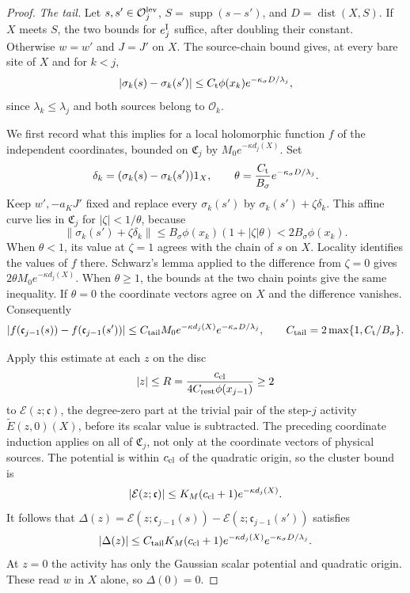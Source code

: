 \documentclass[11pt,letterpaper,reqno]{amsart}
\theoremstyle{definition}
\theoremstyle{remark}
\begin{document}
\begin{proof}
\emph{The tail.}
Let $s,s'\in\mathcal O_j^{\rm lev}$,
$S=\operatorname{supp}(s-s')$, and
$D=\operatorname{dist}(X,S)$. If $X$ meets $S$,
the two bounds for $e_j^{\rm I}$ suffice, after
doubling their constant. Otherwise $w=w'$ and
$J=J'$ on $X$. The source-chain bound gives,
at every bare site of $X$ and for $k<j$,
\[
 |\sigma_k(s)-\sigma_k(s')|
 \le C_{\rm t}\phi(x_k)e^{-\kappa_\sigma D/\lambda_j},
\]
since $\lambda_k\le\lambda_j$ and both sources
belong to $\mathscr O_k$.

We first record what this implies for a local
holomorphic function $f$ of the independent
coordinates, bounded on $\mathfrak C_j$ by
$M_0e^{-\kappa d_j(X)}$. Set
\[
 \delta_k=(\sigma_k(s)-\sigma_k(s'))1_X,
 \qquad
 \theta=\frac{C_{\rm t}}{B_\sigma}
                   e^{-\kappa_\sigma D/\lambda_j}.
\]
Keep $w',-a_KJ'$ fixed and replace every
$\sigma_k(s')$ by $\sigma_k(s')+\zeta\delta_k$.
This affine curve lies in $\mathfrak C_j$ for
$|\zeta|<1/\theta$, because
\[
 \|\sigma_k(s')+\zeta\delta_k\|
 \le B_\sigma\phi(x_k)(1+|\zeta|\theta)
             <2B_\sigma\phi(x_k).
\]
When $\theta<1$, its value at $\zeta=1$ agrees
with the chain of $s$ on $X$. Locality identifies
the values of $f$ there. Schwarz's lemma applied
to the difference from $\zeta=0$ gives
$2\theta M_0e^{-\kappa d_j(X)}$. When
$\theta\ge1$, the bounds at the two chain
points give the same inequality. If $\theta=0$
the coordinate vectors agree on $X$ and the
difference vanishes. Consequently
\[
 |f(\mathfrak c_{j-1}(s))-f(\mathfrak c_{j-1}(s'))|
 \le C_{\rm tail}M_0e^{-\kappa d_j(X)}
                         e^{-\kappa_\sigma D/\lambda_j},
 \qquad C_{\rm tail}=2\max\{1,C_{\rm t}/B_\sigma\}.
\]

Apply this estimate at each $z$ on the disc
\[
 |z|\le R=\frac{c_{\rm cl}}
                   {4C_{\rm rest}\phi(x_{j-1})}\ge2
\]
to $\mathcal E(z;\mathfrak c)$, the degree-zero
part at the trivial pair of the step-$j$ activity
$\widetilde E(z,0)(X)$, before its scalar value
is subtracted. The preceding coordinate induction
applies on all of $\mathfrak C_j$, not only at
the coordinate vectors of physical sources.
The potential is within $c_{\rm cl}$ of the
quadratic origin, so the cluster bound is
\[
 |\mathcal E(z;\mathfrak c)|
       \le K_M(c_{\rm cl}+1)e^{-\kappa d_j(X)}.
\]
It follows that
$\Delta(z)=\mathcal E(z;\mathfrak c_{j-1}(s))
-\mathcal E(z;\mathfrak c_{j-1}(s'))$ satisfies
\[
 |\Delta(z)|\le
 C_{\rm tail}K_M(c_{\rm cl}+1)e^{-\kappa d_j(X)}
                              e^{-\kappa_\sigma D/\lambda_j}.
\]
At $z=0$ the activity has only the Gaussian
scalar potential and quadratic origin. These
read $w$ in $X$ alone, so $\Delta(0)=0$.


\end{proof}
\end{document}
